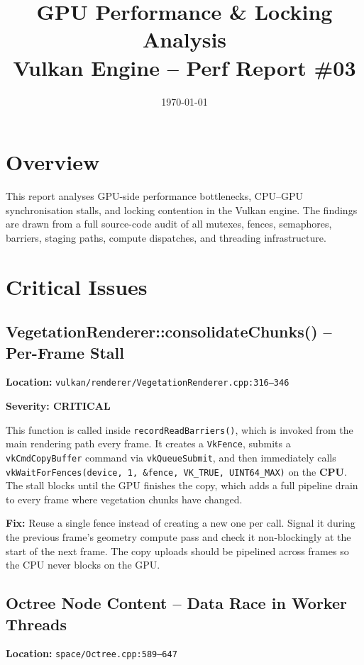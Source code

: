 \documentclass[a4paper,11pt]{article}
\title{\vspace{-2cm}GPU Performance \& Locking Analysis\\
       \large Vulkan Engine -- Perf Report \#03}
\author{}
\date{\today}
\begin{document}
\maketitle

\section{Overview}

This report analyses GPU-side performance bottlenecks, CPU--GPU
synchronisation stalls, and locking contention in the Vulkan engine. The
findings are drawn from a full source-code audit of all mutexes, fences,
semaphores, barriers, staging paths, compute dispatches, and threading
infrastructure.

\section{Critical Issues}

\subsection{VegetationRenderer::consolidateChunks() -- Per-Frame Stall}

\textbf{Location:} \texttt{vulkan/renderer/VegetationRenderer.cpp:316--346}

\textbf{Severity: CRITICAL}

This function is called inside \texttt{recordRead\-Barriers()}, which is
invoked from the main rendering path every frame. It creates a
\texttt{VkFence}, submits a \texttt{vkCmdCopyBuffer} command via
\texttt{vkQueueSubmit}, and then immediately calls
\texttt{vkWaitForFences(device, 1, \&fence, VK\_TRUE, UINT64\_MAX)} on the
\textbf{CPU}. The stall blocks until the GPU finishes the copy, which adds a
full pipeline drain to every frame where vegetation chunks have changed.

\textbf{Fix:} Reuse a single fence instead of creating a new one per call.
Signal it during the previous frame's geometry compute pass and check it
non-blockingly at the start of the next frame. The copy uploads should be
pipelined across frames so the CPU never blocks on the GPU.

\subsection{Octree Node Content -- Data Race in Worker Threads}

\textbf{Location:} \texttt{space/Octree.cpp:589--647}
\end{document}
